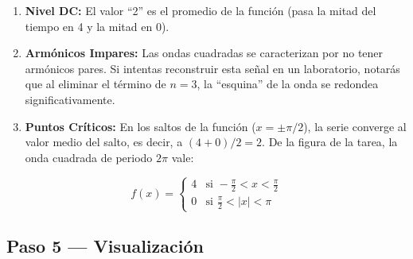 \documentclass[
  letterpaper,
  DIV=11,
  numbers=noendperiod]{scrreprt}
\providecommand{\tightlist}{%
  \setlength{\itemsep}{0pt}\setlength{\parskip}{0pt}}
\begin{document}
\begin{enumerate}
\def\labelenumi{\arabic{enumi}.}
\tightlist
\item
  \textbf{Nivel DC:} El valor ``2'' es el promedio de la función (pasa
  la mitad del tiempo en 4 y la mitad en 0).
\item
  \textbf{Armónicos Impares:} Las ondas cuadradas se caracterizan por no
  tener armónicos pares. Si intentas reconstruir esta señal en un
  laboratorio, notarás que al eliminar el término de \(n=3\), la
  ``esquina'' de la onda se redondea significativamente.
\item
  \textbf{Puntos Críticos:} En los saltos de la función
  (\(x = \pm \pi/2\)), la serie converge al valor medio del salto, es
  decir, a \((4+0)/2 = 2\). De la figura de la tarea, la onda cuadrada
  de periodo \(2\pi\) vale:
\end{enumerate}

\[
f(x) = \begin{cases} 4 & \text{si } -\tfrac{\pi}{2} < x < \tfrac{\pi}{2} \\ 0 & \text{si } \tfrac{\pi}{2} < |x| < \pi \end{cases}
\]

\subsection{Paso 5 --- Visualización}\label{paso-5-visualizaciuxf3n}
\end{document}
